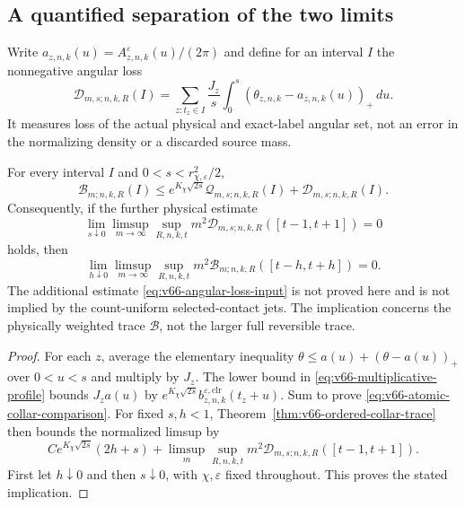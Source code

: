 \subsection{A quantified separation of the two limits}
Write $a_{z,n,k}(u)=A_{z,n,k}^{\varepsilon}(u)/(2\pi)$ and define
for an interval $I$ the nonnegative angular loss
\begin{equation}\label{eq:v66-angular-loss}
 \mathcal D_{m,s;n,k,R}(I)
 =\sum_{z:t_z\in I}\frac{J_z}{s}
           \int_0^s(\theta_{z,n,k}-a_{z,n,k}(u))_+\,du.
\end{equation}
It measures loss of the actual physical and exact-label angular set,
not an error in the normalizing density or a discarded source mass.

\begin{proposition}
\label{prop:v66-atomic-collar-comparison}
For every interval $I$ and $0<s<r_{\chi,\varepsilon}^2/2$,
\begin{equation}\label{eq:v66-atomic-collar-comparison}
 \mathcal B_{m;n,k,R}(I)
 \le e^{K_\chi\sqrt{2s}}\mathcal Q_{m,s;n,k,R}(I)
                           +\mathcal D_{m,s;n,k,R}(I).
\end{equation}
Consequently, if the further physical estimate
\begin{equation}\label{eq:v66-angular-loss-input}
 \lim_{s\downarrow0}\limsup_{m\to\infty}\sup_{R,n,k,t}
                 m^2\mathcal D_{m,s;n,k,R}([t-1,t+1])=0
\end{equation}
holds, then
\begin{equation}\label{eq:v66-conditional-observable-concentration}
 \lim_{h\downarrow0}\limsup_{m\to\infty}\sup_{R,n,k,t}
                m^2\mathcal B_{m;n,k,R}([t-h,t+h])=0.
\end{equation}
The additional estimate \eqref{eq:v66-angular-loss-input} is not
proved here and is not implied by the count-uniform selected-contact
jets. The implication concerns the physically weighted trace
$\mathcal B$, not the larger full reversible trace.
\end{proposition}
\begin{proof}
For each $z$, average the elementary inequality
$\theta\le a(u)+(\theta-a(u))_+$ over $0<u<s$ and multiply by
$J_z$. The lower bound in
\eqref{eq:v66-multiplicative-profile} bounds $J_za(u)$ by
$e^{K_\chi\sqrt{2s}}b_{z,n,k}^{\varepsilon,\mathrm{clr}}(t_z+u)$.
Sum to prove \eqref{eq:v66-atomic-collar-comparison}. For fixed
$s,h<1$, Theorem~\ref{thm:v66-ordered-collar-trace} then bounds
the normalized limsup by
\[
 C e^{K_\chi\sqrt{2s}}(2h+s)
 +\limsup_m\sup_{R,n,k,t}m^2\mathcal D_{m,s;n,k,R}([t-1,t+1]).
\]
First let $h\downarrow0$ and then $s\downarrow0$, with
$\chi,\varepsilon$ fixed throughout. This proves the stated implication.
\end{proof}

